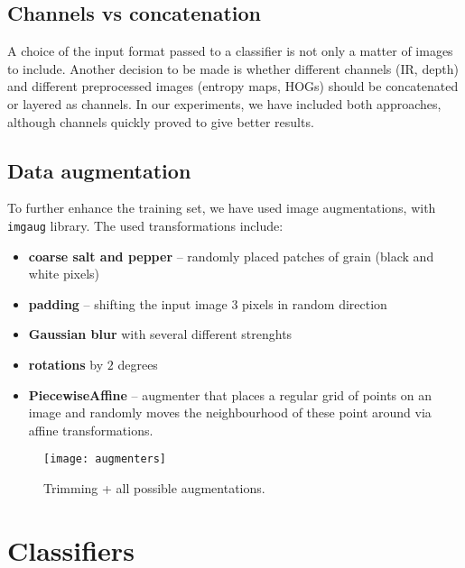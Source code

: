         \subsection*{Channels vs concatenation}
        A choice of the input format passed to a classifier is not only a matter
        of images to include. Another decision to be made is whether different
        channels (IR, depth) and different preprocessed images (entropy maps,
        HOGs) should be concatenated or layered as channels. In our experiments,
        we have included both approaches, although channels quickly proved to
        give better results.

        \subsection*{Data augmentation}
        To further enhance the training set, we have used image augmentations, with \texttt{imgaug}\cite{imgaug} library.
        The used transformations include:
        \begin{itemize}
            \item \textbf{coarse salt and pepper} -- randomly placed patches of grain (black and white pixels)
            \item \textbf{padding} -- shifting the input image $3$ pixels in random direction
            \item \textbf{Gaussian blur} with several different strenghts
            \item \textbf{rotations} by $2$ degrees
            \item \textbf{PiecewiseAffine} -- augmenter that places a regular grid of points on an image and randomly moves the neighbourhood of these point around via affine transformations.
        \end{itemize}
        \begin{figure}[H]
        \caption{Trimming + all possible augmentations.}
        \centering
        \texttt{[image: augmenters]}
        \end{figure}

    \section{Classifiers}
